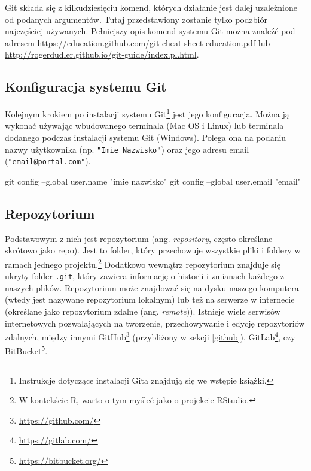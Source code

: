 \documentclass[paper=6in:9in,pagesize=pdftex,headinclude=on,footinclude=on,10pt]{scrbook}
\newenvironment{Shaded}{\begin{snugshade}}{\end{snugshade}}
\newcommand{\FunctionTok}[1]{\textcolor[rgb]{0.00,0.00,0.00}{#1}}
\newcommand{\NormalTok}[1]{#1}
\newcommand{\StringTok}[1]{\textcolor[rgb]{0.31,0.60,0.02}{#1}}
\DeclareRobustCommand{\href}[2]{#2\footnote{\url{#1}}}
\begin{document}
Git składa się z kilkudziesięciu komend, których działanie jest dalej uzależnione od podanych argumentów.
Tutaj przedstawiony zostanie tylko podzbiór najczęściej używanych.
Pełniejszy opis komend systemu Git można znaleźć pod adresem \url{https://education.github.com/git-cheat-sheet-education.pdf} lub \url{http://rogerdudler.github.io/git-guide/index.pl.html}.

\hypertarget{konfiguracja-systemu-git}{%
\subsection{Konfiguracja systemu Git}\label{konfiguracja-systemu-git}}

Kolejnym krokiem po instalacji systemu Git\footnote{Instrukcje dotyczące instalacji Gita znajdują się we wstępie książki.} jest jego konfiguracja.
Można ją wykonać używając wbudowanego terminala (Mac OS i Linux) lub terminala dodanego podczas instalacji systemu Git (Windows).
Polega ona na podaniu nazwy użytkownika (np. \texttt{"Imie\ Nazwisko"}) oraz jego adresu email (\texttt{"email@portal.com"}).

\begin{Shaded}
\begin{Highlighting}[]
\FunctionTok{git}\NormalTok{ config --global user.name }\StringTok{"imie nazwisko"}
\FunctionTok{git}\NormalTok{ config --global user.email }\StringTok{"email"}
\end{Highlighting}
\end{Shaded}

\hypertarget{repozytorium}{%
\subsection{Repozytorium}\label{repozytorium}}

Podstawowym z nich jest repozytorium (ang. \emph{repository}, często określane skrótowo jako repo).
Jest to folder, który przechowuje wszystkie pliki i foldery w ramach jednego projektu.\footnote{W kontekście R, warto o tym myśleć jako o projekcie RStudio.}
Dodatkowo wewnątrz repozytorium znajduje się ukryty folder \texttt{.git}, który zawiera informację o historii i zmianach każdego z naszych plików.
Repozytorium może znajdować się na dysku naszego komputera (wtedy jest nazywane repozytorium lokalnym) lub też na serwerze w internecie (określane jako repozytorium zdalne (ang. \emph{remote})).
Istnieje wiele serwisów internetowych pozwalających na tworzenie, przechowywanie i edycję repozytoriów zdalnych, między innymi \href{https://github.com/}{GitHub} (przybliżony w sekcji \ref{github}), \href{https://gitlab.com/}{GitLab}, czy \href{https://bitbucket.org/}{BitBucket}.
\end{document}

